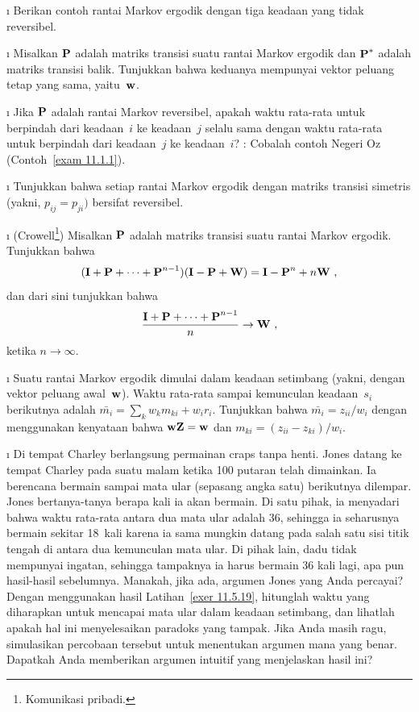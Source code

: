 \begin{LJSItem}
\i\label{exer 11.5.12} Berikan contoh rantai Markov ergodik dengan tiga keadaan
yang tidak reversibel.

\i\label{exer 11.5.13} Misalkan ${\mbox{\bf P}\/}$ adalah matriks transisi suatu rantai
Markov ergodik dan ${\mbox{\bf P}\/}^*$ adalah matriks transisi balik. Tunjukkan bahwa
keduanya mempunyai vektor peluang tetap yang sama, yaitu~${\mbox{\bf w}\/}$.

\i\label{exer 11.5.14} Jika ${\mbox{\bf P}\/}$ adalah rantai Markov reversibel, apakah
waktu rata-rata untuk berpindah dari keadaan~$i$ ke keadaan~$j$ selalu sama
dengan waktu rata-rata untuk berpindah dari keadaan~$j$ ke keadaan~$i$?
: Cobalah contoh Negeri Oz (Contoh~\ref{exam 11.1.1}).

\i\label{exer 11.5.15} Tunjukkan bahwa setiap rantai Markov ergodik dengan
matriks transisi simetris (yakni, $p_{ij} = p_{ji})$ bersifat reversibel.

\i\label{exer 11.5.18} (Crowell\footnote{Komunikasi
pribadi.}) Misalkan ${\mbox{\bf P}\/}$ adalah matriks transisi suatu
rantai Markov ergodik. Tunjukkan bahwa
$$
({\mbox{\bf I}\/} + {\mbox{\bf P}\/} +\cdots+ {\mbox{\bf P}\/}^{n - 1})({\mbox{\bf I}\/} - {\mbox{\bf P}\/} + {\mbox{\bf W}\/})
= {\mbox{\bf I}\/} -
{\mbox{\bf P}\/}^n + n{\mbox{\bf W}\/}\ ,
$$
dan dari sini tunjukkan bahwa
$$
\frac{{\mbox{\bf I}\/} + {\mbox{\bf P}\/} +\cdots+ {\mbox{\bf P}\/}^{n - 1}}n \to {\mbox{\bf W}\/}\ ,
$$ 
ketika $n \rightarrow \infty$.

\i\label{exer 11.5.19} Suatu rantai Markov ergodik dimulai dalam keadaan
setimbang (yakni, dengan vektor peluang awal~${\mbox{\bf w}\/}$). Waktu rata-rata sampai
kemunculan keadaan~$s_i$ berikutnya adalah
$\bar{m_i} = \sum_k w_k m_{ki} + w_i r_i$. Tunjukkan bahwa
$\bar {m_i} = z_{ii}/w_i$ dengan menggunakan kenyataan bahwa ${\mbox{\bf w}\/}{\mbox{\bf Z}\/}
= {\mbox{\bf w}\/}$ dan $m_{ki} = (z_{ii} - z_{ki})/w_i$.

\i\label{exer 11.5.20} Di tempat Charley berlangsung permainan
craps tanpa henti. Jones datang ke tempat Charley pada suatu malam
ketika 100 putaran telah dimainkan. Ia berencana bermain sampai mata ular
(sepasang angka satu) berikutnya dilempar. Jones bertanya-tanya berapa kali ia
akan bermain. Di satu pihak, ia menyadari bahwa waktu rata-rata antara dua mata
ular adalah 36, sehingga ia seharusnya bermain sekitar 18~kali karena ia sama
mungkin datang pada salah satu sisi titik tengah di antara dua kemunculan mata
ular. Di pihak lain, dadu tidak mempunyai ingatan, sehingga tampaknya ia harus
bermain 36 kali lagi, apa pun hasil-hasil sebelumnya. Manakah, jika ada, argumen
Jones yang Anda percayai? Dengan menggunakan hasil Latihan~\ref{exer 11.5.19},
hitunglah waktu yang diharapkan untuk mencapai mata ular dalam keadaan setimbang,
dan lihatlah apakah hal ini menyelesaikan paradoks yang tampak. Jika Anda masih
ragu, simulasikan percobaan tersebut untuk menentukan argumen mana yang benar.
Dapatkah Anda memberikan argumen intuitif yang menjelaskan hasil ini?


\end{LJSItem}

